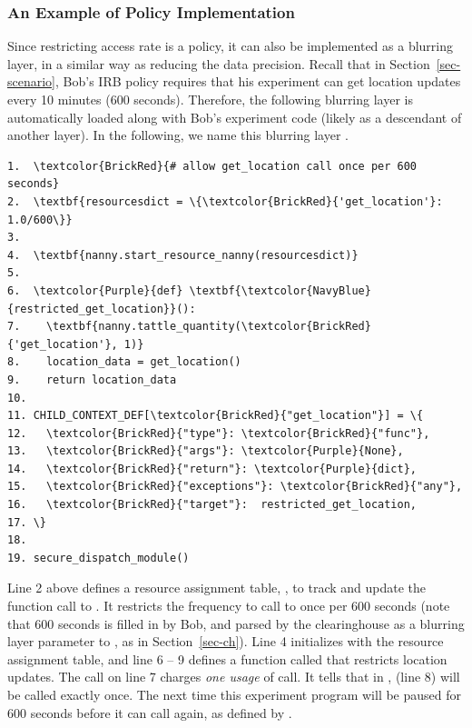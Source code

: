 \subsubsection{An Example of Policy Implementation}\label{sec-rate-example}

Since restricting access rate is a policy, it can also be implemented as a 
blurring layer, in a similar way as reducing the data precision.
Recall that in Section~\ref{sec-scenario}, Bob's IRB policy requires that
his experiment can get location updates every 10 minutes (600 seconds). 
Therefore, the following blurring layer is automatically loaded along with 
Bob's experiment code (likely as a descendant of another layer). In 
the following, we name this blurring layer .

\begin{Verbatim}
1.  \textcolor{BrickRed}{# allow get_location call once per 600 seconds}
2.  \textbf{resourcesdict = \{\textcolor{BrickRed}{'get_location'}: 1.0/600\}} 
3.
4.  \textbf{nanny.start_resource_nanny(resourcesdict)}
5.
6.  \textcolor{Purple}{def} \textbf{\textcolor{NavyBlue}{restricted_get_location}}():
7.    \textbf{nanny.tattle_quantity(\textcolor{BrickRed}{'get_location'}, 1)}
8.    location_data = get_location()
9.    return location_data
10.
11. CHILD_CONTEXT_DEF[\textcolor{BrickRed}{"get_location"}] = \{
12.   \textcolor{BrickRed}{"type"}: \textcolor{BrickRed}{"func"},
13.   \textcolor{BrickRed}{"args"}: \textcolor{Purple}{None},
14.   \textcolor{BrickRed}{"return"}: \textcolor{Purple}{dict},
15.   \textcolor{BrickRed}{"exceptions"}: \textcolor{BrickRed}{"any"},
16.   \textcolor{BrickRed}{"target"}:  restricted_get_location,
17. \}
18. 
19. secure_dispatch_module()
\end{Verbatim}

Line 2 above defines a resource assignment table, , to track and update 
the function call to . It restricts the frequency to 
call  to once per 600 seconds (note that 
600 seconds is filled in by Bob, and parsed by the clearinghouse as a blurring layer 
parameter to , as in Section~\ref{sec-ch}). Line 4 initializes  
with the resource assignment table, and line 6 -- 9 defines a 
function called  that restricts location updates. 
The  call on line 7 charges \textit{one usage} of  
call. It tells  that in , 
 (line 8) will be called exactly once. The
next time this experiment program 
will be paused for 600 seconds before it can call  again,
as defined by .

